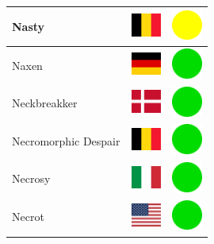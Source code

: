 \documentclass[12pt, a4paper, twoside]{report}
\begin{document}
\begin{center}
\begin{longtable}{|p{5cm}|p{2cm}|p{2cm}|}
 Nasty                                                      & \includegraphics[width=1cm]{../img/flags/be} &   \includegraphics[width=1cm]{../likes/m} \\ \hline
 Naxen                                                      & \includegraphics[width=1cm]{../img/flags/de} &   \includegraphics[width=1cm]{../likes/y} \\ \hline
 Neckbreakker                                               & \includegraphics[width=1cm]{../img/flags/dk} &   \includegraphics[width=1cm]{../likes/y} \\ \hline
 Necromorphic Despair                                       & \includegraphics[width=1cm]{../img/flags/be} &   \includegraphics[width=1cm]{../likes/y} \\ \hline
 Necrosy                                                    & \includegraphics[width=1cm]{../img/flags/it} &   \includegraphics[width=1cm]{../likes/y} \\ \hline
 Necrot                                                     & \includegraphics[width=1cm]{../img/flags/us} &   \includegraphics[width=1cm]{../likes/y} \\ \hline

\end{longtable}
\end{center}
\end{document}
